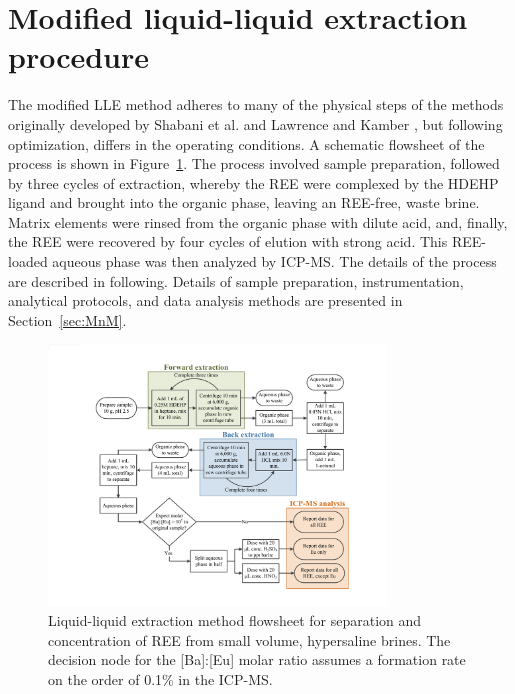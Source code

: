 \section{Modified liquid-liquid extraction procedure}

The modified LLE method adheres to many of the physical steps of the methods originally developed by Shabani et al. 
\citep{Shabani_AC_1990} and Lawrence and Kamber \citep{Lawrence_GGR_2007}, but following optimization, differs in the operating conditions.
A schematic flowsheet of the process is shown in Figure~\ref{fig:flowsheet}.
The process involved sample preparation, followed by three cycles of extraction, whereby the REE were complexed by the HDEHP ligand and brought into the organic phase, leaving an REE-free, waste brine.
Matrix elements were rinsed from the organic phase with dilute acid, and, finally, the REE were recovered by four cycles of elution with strong acid.
This REE-loaded aqueous phase was then analyzed by ICP-MS.
The details of the process are described in following. Details of sample preparation, instrumentation, analytical protocols, and data analysis methods are presented in Section~\ref{sec:MnM}.

\begin{figure}
\begin{center}
\includegraphics[width=0.8\textwidth]{Ch4_figures/LLE-flowsheet.pdf}
\caption{Liquid-liquid extraction method flowsheet for separation and concentration of REE from small volume, hypersaline brines. The decision node for the [Ba]:[Eu] molar ratio assumes a  formation rate on the order of 0.1\% in the ICP-MS.}\label{fig:flowsheet}
\end{center}
\end{figure}

